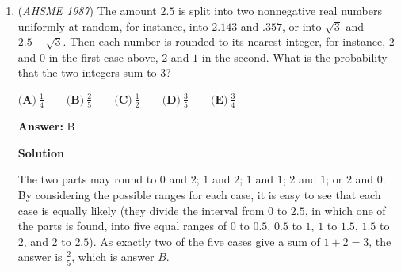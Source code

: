 \begin{enumerate}
 $\textbf{(A)}\ \frac{1}{2} \qquad \textbf{(B)}\ 1 \qquad \textbf{(C)}\ \frac{3}{2} \qquad \textbf{(D)}\ \frac{13}{2}\qquad \textbf{(E)}\ \text{there is no minimum}$

 \textbf{Answer: }C



\textbf{Solution}

Let $C$ have coordinates $(p, q)$. Then by the Shoelace Formula, the area of $\triangle ABC$ is $\frac{3}{2} \lvert {12q-5p} \rvert$. Since $p$ and $q$ are integers, $\lvert {12q-5p} \rvert$ is a positive integer, and by Bezout's Lemma, it can equal $1$ (e.g. with $q = 2, p = 5$), so the minimum area is $\frac{3}{2} \times 1 = \frac{3}{2}$, which is answer $\boxed{C}$.

 


 



\textbf{Solution 2}

Let $C$ have coordinates $(p, q)$. The length of $AB$ is $\sqrt{(36-0)^2+(15-0)^2}=39.$ The equation of line $AB$ is $5x-12y=0.$ Then, by the point-line distance formula the length of the altitude from $C$ to $AB$ is $\frac{|5p-12q|}{\sqrt{5^2+12^2}}=\frac{|5p-12q|}{13}.$ Thus the area of the triangle is $39 \cdot \frac{|5p-12q|}{13}=\frac{3}{2} \lvert {12q-5p} \rvert.$ Then proceed as in solution $1$ from here.

 -AndrewZhong2012

 


	\item (\textit{AHSME 1987}) The amount $2.5$ is split into two nonnegative real numbers uniformly at random, 
for instance, into $2.143$ and $.357$, or into $\sqrt{3}$ and $2.5-\sqrt{3}$. 
Then each number is rounded to its nearest integer, for instance, $2$ and $0$ in the first case above, 
$2$ and $1$ in the second. What is the probability that the two integers sum to $3$?


 $\textbf{(A)}\ \frac{1}{4} \qquad \textbf{(B)}\ \frac{2}{5} \qquad \textbf{(C)}\ \frac{1}{2} \qquad \textbf{(D)}\ \frac{3}{5}\qquad \textbf{(E)}\ \frac{3}{4}$

 \textbf{Answer: }B



\textbf{Solution}

The two parts may round to $0$ and $2$; $1$ and $2$; $1$ and $1$; $2$ and $1$; or $2$ and $0$. By considering the possible ranges for each case, it is easy to see that each case is equally likely (they divide the interval from $0$ to $2.5$, in which one of the parts is found, into five equal ranges of $0$ to $0.5$, $0.5$ to $1$, $1$ to $1.5$, $1.5$ to $2$, and $2$ to $2.5$). As exactly two of the five cases give a sum of $1 + 2 = 3$, the answer is $\frac{2}{5}$, which is answer $\boxed{B}$.


\end{enumerate}
